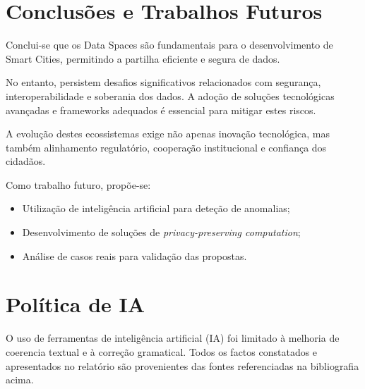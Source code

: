 \documentclass[a4paper]{article}
\begin{document}
\newpage
\section{Conclusões e Trabalhos Futuros}\label{conclusoes}
Conclui-se que os Data Spaces são fundamentais para o desenvolvimento de Smart Cities, permitindo a partilha eficiente e segura de dados.

No entanto, persistem desafios significativos relacionados com segurança, interoperabilidade e soberania dos dados. A adoção de soluções tecnológicas avançadas e frameworks adequados é essencial para mitigar estes riscos.

A evolução destes ecossistemas exige não apenas inovação tecnológica, mas também alinhamento regulatório, cooperação institucional e confiança dos cidadãos.

Como trabalho futuro, propõe-se:
\begin{itemize}
    \item Utilização de inteligência artificial para deteção de anomalias;
    \item Desenvolvimento de soluções de \textit{privacy-preserving computation};
    \item Análise de casos reais para validação das propostas.
\end{itemize}

\newpage 
\renewcommand{\refname}{Bibliografia} %
\renewcommand{\bibname}{Bibliografia} %
\printbibliography

\section{Política de IA}\label{ia}
O uso de ferramentas de inteligência artificial (IA) foi limitado à melhoria de coerencia textual e à correção gramatical.
Todos os factos constatados e apresentados no relatório são provenientes das fontes referenciadas na bibliografia acima.
\end{document}
